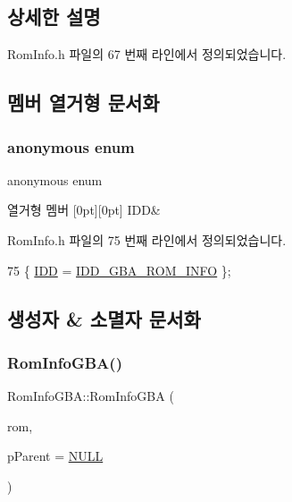 \subsection{상세한 설명}


Rom\+Info.\+h 파일의 67 번째 라인에서 정의되었습니다.



\subsection{멤버 열거형 문서화}
\mbox{\label{class_rom_info_g_b_a_a6425fe061557249d4e064c130d9768f8}} 
\subsubsection{\texorpdfstring{anonymous enum}{anonymous enum}}
{\footnotesize\ttfamily anonymous enum}

\begin{DoxyEnumFields}{열거형 멤버}
[0pt][0pt]{}\mbox{\label{class_rom_info_g_b_a_a6425fe061557249d4e064c130d9768f8a10060dd49f055afb737390d2a0f0c93c}} 
I\+DD&\\
\hline

\end{DoxyEnumFields}


Rom\+Info.\+h 파일의 75 번째 라인에서 정의되었습니다.


\begin{DoxyCode}
75 \{ \mbox{\hyperlink{class_rom_info_g_b_a_a6425fe061557249d4e064c130d9768f8a10060dd49f055afb737390d2a0f0c93c}{IDD}} = \mbox{\hyperlink{resource_8h_a05f991424440ad42446337968276cf1a}{IDD\_GBA\_ROM\_INFO}} \};
\end{DoxyCode}


\subsection{생성자 \& 소멸자 문서화}
\mbox{\label{class_rom_info_g_b_a_a60647da88fd06c7e804844aa1836415c}} 
\subsubsection{\texorpdfstring{Rom\+Info\+G\+B\+A()}{RomInfoGBA()}}
{\footnotesize\ttfamily Rom\+Info\+G\+B\+A\+::\+Rom\+Info\+G\+BA (\begin{DoxyParamCaption}\item[{\mbox{\hyperlink{_system_8h_aed742c436da53c1080638ce6ef7d13de}{u8}} $\ast$}]{rom,  }\item[{C\+Wnd $\ast$}]{p\+Parent = {\ttfamily \mbox{\hyperlink{_system_8h_a070d2ce7b6bb7e5c05602aa8c308d0c4}{N\+U\+LL}}} }\end{DoxyParamCaption})}



